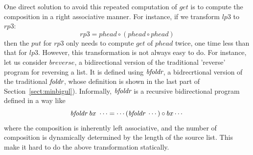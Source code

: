 

One direct solution to avoid this repeated computation of $get$ is to compute the composition in a right associative manner. For instance, if we transform  $lp3$ to $rp3$:
\[
rp3 = phead \circ (phead \circ phead)
\]
then the $put$ for $rp3$ only needs to compute $get$ of $phead$ twice, one time less than that for $lp3$.
 However, this transformation is not always easy to do. For instance, let us consider $breverse$, a bidirectional version of the traditional 'reverse' program for reversing a list. It is defined using $\mbox{\it bfoldr}$, a bidrecrtional version of the traditional $\mbox{\it foldr}$, whose definition  is shown in the last part of Section~\ref{sect:minbigul}). Informally, $\mbox{\it bfoldr}$ is a recursive bidirectional program defined in a way like
 \[
 \mbox{\it bfoldr}~bx~\cdots = \cdots  (\mbox{\it bfoldr}~\cdots) \circ bx \cdots
 \]
where the composition is inherently left associative, and the number of composition is dynamically determined by the length of the source list. This make it hard to do the above transformation statically.



